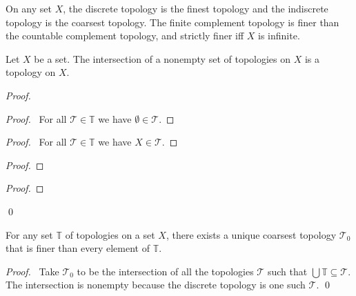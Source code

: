 \begin{note}
  On any set $X$, the discrete topology is the finest topology and the indiscrete topology is the coarsest topology. The finite complement topology is finer than the countable complement topology, and strictly finer iff $X$ is infinite.
\end{note}

\begin{prop}
  Let $X$ be a set. The intersection of a nonempty set of topologies on $X$ is a topology on $X$.
\end{prop}

\begin{proof}
  \pf
  \begin{proof}
    \pf\ For all $\mathcal{T} \in \mathbb{T}$ we have $\emptyset \in \mathcal{T}$.
  \end{proof}
  \begin{proof}
    \pf\ For all $\mathcal{T} \in \mathbb{T}$ we have $X \in \mathcal{T}$.
  \end{proof}
  \begin{proof}
  \end{proof}
  \begin{proof}
  \end{proof}
  \qed
\end{proof}

\begin{cor}
  For any set $\mathbb{T}$ of topologies on a set $X$, there exists a unique coarsest topology $\mathcal{T}_0$ that is finer than every element of $\mathbb{T}$.
\end{cor}

\begin{proof}
  \pf\ Take $\mathcal{T}_0$ to be the intersection of all the topologies $\mathcal{T}$ such that $\bigcup \mathbb{T} \subseteq \mathcal{T}$. The intersection is nonempty because the discrete topology is one such $\mathcal{T}$. \qed
\end{proof}

